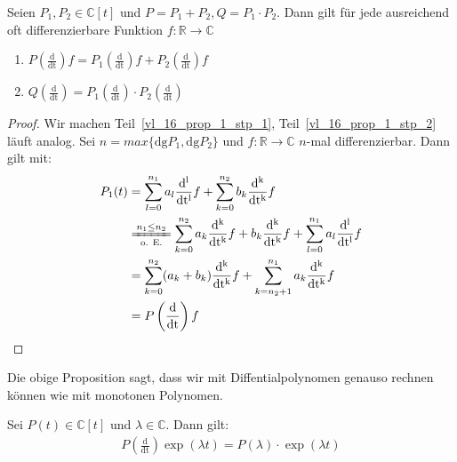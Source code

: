 \begin{Proposition}{\label{vl_16_prop_1}
	Seien $P_1, P_2 \in \mathbb{C}[t]$ und $P=P_1 + P_2, Q = P_1 \cdot P_2$. 
	Dann gilt für jede ausreichend oft differenzierbare Funktion $f : \mathbb{R} 
	\rightarrow \mathbb{C}$
	\begin{enumerate}
		\item \label{vl_16_prop_1_stp_1} $P\left(\frac{\mathrm{d}}{\mathrm{dt}}\right) f = 
		P_1\left( \frac{\mathrm{d}}{\mathrm{dt}} \right) f + P_2 
		\left( \frac{\mathrm{d}}{\mathrm{dt}} \right) f$
		\item \label{vl_16_prop_1_stp_2} $Q \left(\frac{\mathrm{d}}{\mathrm{dt}}\right) = 
		P_1\left( \frac{\mathrm{d}}{\mathrm{dt}} \right) \cdot 
		P_2 \left( \frac{\mathrm{d}}{\mathrm{dt}} \right)$
	\end{enumerate}
}\end{Proposition}

\begin{proof}
	Wir machen Teil~\ref{vl_16_prop_1_stp_1}, Teil~\ref{vl_16_prop_1_stp_2} läuft analog.
	 Sei $n = max\{\mathrm{dg}P_1, \mathrm{dg}P_2\}$  und 
	 $f: \mathbb{R} \rightarrow \mathbb{C}$ $n$-mal differenzierbar. 
	 Dann gilt mit: 
	 \begin{align*}
	 	P_1(t) & = \sum_{l=0}^{n_1}a_l 
		\frac{\mathrm{d^l}}{\mathrm{dt^l}} f + \sum_{k = 0}^{n_2} b_k 
		\frac{\mathrm{d^k}}{\mathrm{dt^k}}f \\
		& \xlongequal[\text{o. E.}]{n_1 \leq n_2} 
	 	\sum_{k=0}^{n_2}a_k \frac{\mathrm{d^k}}{\mathrm{dt^k}} f + b_k 
	 	\frac{\mathrm{d^k}}{\mathrm{dt^k}}f + 
		\sum_{l= 0}^{n_1} a_l \frac{\mathrm{d^l}}{\mathrm{dt^l}}f \\
		& =  \sum_{k=0}^{n_2}(a_k+b_k) \frac{\mathrm{d^k}}{\mathrm{dt^k}}f + 
		\sum_{k=n_2+1}^{n_1}a_k \frac{\mathrm{d^k}}{\mathrm{dt^k}} f \\
		& = P\left(\frac{\mathrm{d}}{\mathrm{dt}}\right)f
	\end{align*}
\end{proof}

\begin{Bemerkung}{
	Die obige Proposition sagt, dass wir mit Diffentialpolynomen genauso rechnen 
	können wie mit \glqq monotonen\grqq{} Polynomen.
}\end{Bemerkung}

\begin{Proposition}{
	Sei $P(t) \in \mathbb{C}[t]$ und $\lambda\in \mathbb{C}$. Dann gilt:
	\begin{align*}
		P\left(\frac{\mathrm{d}}{\mathrm{dt}}\right)\exp(\lambda t) = 
		P(\lambda)\cdot\exp(\lambda t)
	\end{align*}
}\end{Proposition}

